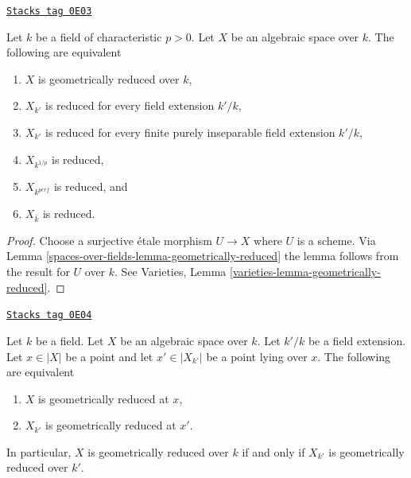 \begin{lemma}
\label{spaces-over-fields-lemma-geometrically-reduced-positive-characteristic}
\href{https://stacks.math.columbia.edu/tag/0E03}{\texttt{Stacks tag 0E03}}

Let $k$ be a field of characteristic $p > 0$. Let $X$ be an algebraic space
over $k$. The following are equivalent
\begin{enumerate}
\item $X$ is geometrically reduced over $k$,
\item $X_{k'}$ is reduced for every field extension $k'/k$,
\item $X_{k'}$ is reduced for every
finite purely inseparable field extension $k'/k$,
\item $X_{k^{1/p}}$ is reduced,
\item $X_{k^{perf}}$ is reduced, and
\item $X_{\bar k}$ is reduced.
\end{enumerate}
\end{lemma}

\begin{proof}
Choose a surjective \'etale morphism $U \to X$ where $U$ is a scheme.
Via Lemma \ref{spaces-over-fields-lemma-geometrically-reduced} the lemma follows from
the result for $U$ over $k$.
See Varieties, Lemma \ref{varieties-lemma-geometrically-reduced}.
\end{proof}

\begin{lemma}
\label{spaces-over-fields-lemma-geometrically-reduced-upstairs}
\href{https://stacks.math.columbia.edu/tag/0E04}{\texttt{Stacks tag 0E04}}

Let $k$ be a field. Let $X$ be an algebraic space over $k$.
Let $k'/k$ be a field extension. Let $x \in |X|$ be a point and let
$x' \in |X_{k'}|$ be a point lying over $x$.
The following are equivalent
\begin{enumerate}
\item $X$ is geometrically reduced at $x$,
\item $X_{k'}$ is geometrically reduced at $x'$.
\end{enumerate}
In particular, $X$ is geometrically reduced over $k$ if and only if
$X_{k'}$ is geometrically reduced over $k'$.
\end{lemma}

